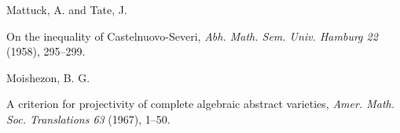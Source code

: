 {\par\vspace{2.15pt}\noindent \hypertarget{bib-479-18}{}Mattuck, A. and Tate, J.\par
\noindent\hangindent=25bp\hspace*{6bp}%
On the inequality of Castelnuovo-Severi, \emph{Abh. Math. Sem. Univ. Hamburg 22} (1958), 295--299.\par
\par\vspace{2.15pt}\noindent \hypertarget{bib-479-19}{}Moishezon, B. G.\par
\noindent\hangindent=25bp\hspace*{6bp}%
A criterion for projectivity of complete algebraic abstract varieties, \emph{Amer. Math. Soc. Translations 63} (1967), 1--50.\par
}
